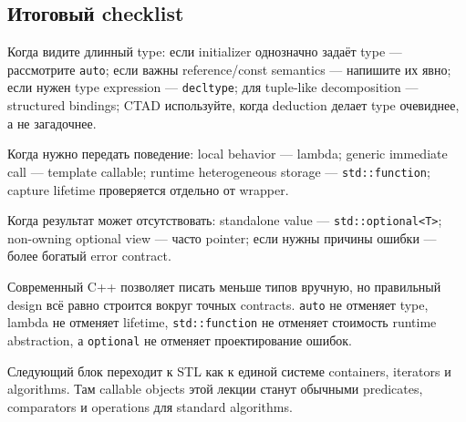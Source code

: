 \subsection{Итоговый checklist}

Когда видите длинный type:
если initializer однозначно задаёт type --- рассмотрите \texttt{auto}; если важны reference/const semantics --- напишите их явно; если нужен type expression --- \texttt{decltype}; для tuple-like decomposition --- structured bindings; CTAD используйте, когда deduction делает type очевиднее, а не загадочнее.

Когда нужно передать поведение:
local behavior --- lambda; generic immediate call --- template callable; runtime heterogeneous storage --- \texttt{std::function}; capture lifetime проверяется отдельно от wrapper.

Когда результат может отсутствовать:
standalone value --- \texttt{std::optional<T>}; non-owning optional view --- часто pointer; если нужны причины ошибки --- более богатый error contract.

\begin{importantbox}
Современный C++ позволяет писать меньше типов вручную, но правильный design всё
равно строится вокруг точных contracts. \texttt{auto} не отменяет type,
lambda не отменяет lifetime, \texttt{std::function} не отменяет стоимость
runtime abstraction, а \texttt{optional} не отменяет проектирование ошибок.
\end{importantbox}

Следующий блок переходит к STL как к единой системе containers, iterators и
algorithms. Там callable objects этой лекции станут обычными predicates,
comparators и operations для standard algorithms.
